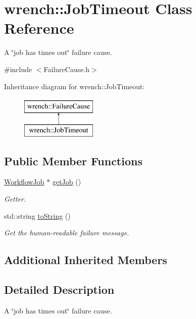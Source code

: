 \hypertarget{classwrench_1_1_job_timeout}{}\section{wrench\+:\+:Job\+Timeout Class Reference}
\label{classwrench_1_1_job_timeout}


A \char`\"{}job has times out\char`\"{} failure cause.  




{\ttfamily \#include $<$Failure\+Cause.\+h$>$}

Inheritance diagram for wrench\+:\+:Job\+Timeout\+:\begin{figure}[H]
\begin{center}
\leavevmode
\includegraphics[height=2.000000cm]{classwrench_1_1_job_timeout}
\end{center}
\end{figure}
\subsection*{Public Member Functions}
\begin{DoxyCompactItemize}
\item 
\hyperlink{classwrench_1_1_workflow_job}{Workflow\+Job} $\ast$ \hyperlink{classwrench_1_1_job_timeout_a6c3fdde31850803e7eb2e159be735880}{get\+Job} ()
\begin{DoxyCompactList}\small\item\em Getter. \end{DoxyCompactList}\item 
std\+::string \hyperlink{classwrench_1_1_job_timeout_a91515ca59f71777de74a4b0b169d12e7}{to\+String} ()
\begin{DoxyCompactList}\small\item\em Get the human-\/readable failure message. \end{DoxyCompactList}\end{DoxyCompactItemize}
\subsection*{Additional Inherited Members}


\subsection{Detailed Description}
A \char`\"{}job has times out\char`\"{} failure cause. 

